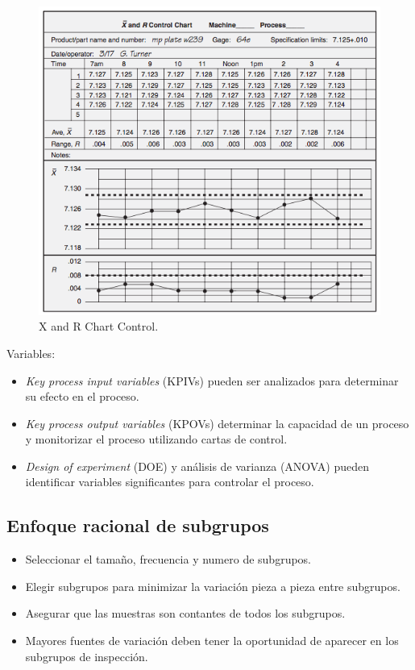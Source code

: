 \documentclass[]{article}
\begin{document}
\begin{figure}[H]
	\centering
	\includegraphics[width=120mm]{imagenes/XandRControl.png}
	\caption{X and R Chart Control.}
	\label{fig:XandRControl}
\end{figure}

Variables:
\begin{itemize}
	\item \textit{Key process input variables} (KPIVs) pueden ser analizados para determinar su efecto en el proceso.
	\item \textit{Key process output variables} (KPOVs) determinar la capacidad de un proceso y monitorizar el proceso utilizando cartas de control.
	\item \textit{Design of experiment} (DOE) y análisis de varianza (ANOVA) pueden identificar variables significantes para controlar el proceso.
\end{itemize}

\subsection{Enfoque racional de subgrupos}

\begin{itemize}
	\item Seleccionar el tamaño, frecuencia y numero de subgrupos.
	\item Elegir subgrupos para minimizar la variación pieza a pieza entre subgrupos.
	\item Asegurar que las muestras son contantes de todos los subgrupos.
	\item Mayores fuentes de variación deben tener la oportunidad de aparecer en los subgrupos de inspección.
\end{itemize}
\end{document}
